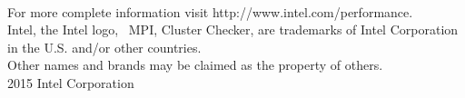 \newline \\
\noindent For more complete information visit http://www.intel.com/performance.  
\newline \\
\noindent Intel, the Intel logo, \Intel{}~MPI, \Intel{} Cluster Checker, \FSP{} are trademarks of Intel Corporation in the U.S. and/or other countries.
\newline \\
\noindent *Other names and brands may be claimed as the property of others.  
\newline \\
\noindent {\small\copyright} 2015 Intel Corporation

